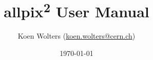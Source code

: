 \documentclass{scrartcl}
\title{allpix\textsuperscript{2} User Manual} %
\author{
    Koen Wolters (\href{mailto:koen.wolters@cern.ch}{koen.wolters@cern.ch})
} %
\date{\today} %
\begin{document}
\maketitle %


\begin{abstract}
\end{abstract}

\newpage
\tableofcontents

\newpage



\clearpage
{}
{}
\begin{thebibliography}{99}
  
\end{thebibliography}
\end{document}
